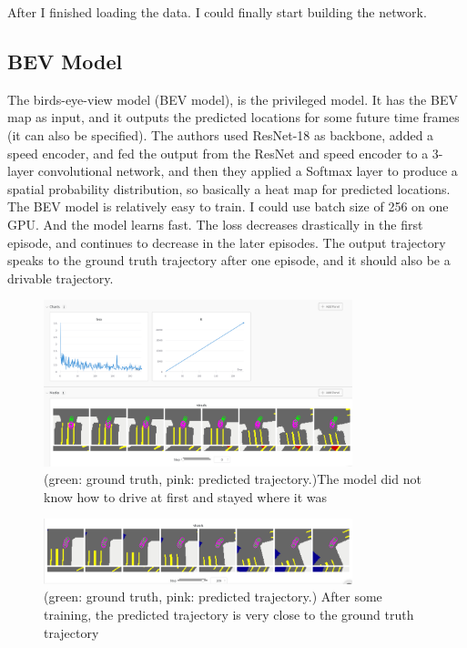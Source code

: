 \documentclass[inputenc=utf8]{ldvarticle}
\begin{document}
\noindent After I finished loading the data. I could finally start building the network.


\subsection {BEV Model}
The birds-eye-view model (BEV model), is the privileged model. It has the BEV map as input, and it outputs the predicted locations for some future time frames (it can also be specified). The authors used ResNet-18 as backbone, added a speed encoder, and fed the output from the ResNet and speed encoder to a 3-layer convolutional network, and then they applied a Softmax layer to produce a spatial probability distribution, so basically a heat map for predicted locations.
\\

\noindent The BEV model is relatively easy to train. I could use batch size of 256 on one GPU. And the model learns fast. The loss decreases drastically in the first episode, and continues to decrease in the later episodes. The output trajectory speaks to the ground truth trajectory after one episode, and it should also be a drivable trajectory.
\begin{figure}[H]
  \centering
  \includegraphics[width=0.8\textwidth] {bilder/cool_microwave_1.png} %
  \caption{(green: ground truth, pink: predicted trajectory.)The model did not know how to drive at first and stayed where it was}
\end{figure}

\begin{figure}[H]
  \centering
  \includegraphics[width=0.8\textwidth] {bilder/cool_microwave_2.png} 
  \caption{(green: ground truth, pink: predicted trajectory.) After some training, the predicted trajectory is very close to the ground truth trajectory }
\end{figure}
\end{document}
